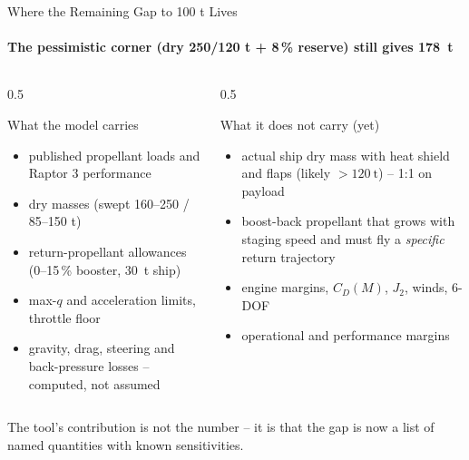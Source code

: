 \documentclass[aspectratio=169,10pt]{beamer}
\begin{document}
\begin{frame}{Where the Remaining Gap to 100 t Lives}
  \framesubtitle{The pessimistic corner (dry 250/120 t + 8\,\% reserve) still gives \SI{178}{\tonne}}
  \begin{columns}[T]
    \begin{column}{0.5\textwidth}
      \begin{block}{What the model carries}
        \begin{itemize}
          \item published propellant loads and Raptor 3 performance
          \item dry masses (swept 160--250 / 85--150 t)
          \item return-propellant allowances (0--15\,\% booster, \SI{30}{\tonne} ship)
          \item max-$q$ and acceleration limits, throttle floor
          \item gravity, drag, steering and back-pressure losses -- computed, not assumed
        \end{itemize}
      \end{block}
    \end{column}
    \begin{column}{0.5\textwidth}
      \begin{block}{What it does not carry (yet)}
        \begin{itemize}
          \item actual ship dry mass with heat shield and flaps (likely $>\SI{120}{\tonne}$) -- 1:1 on payload
          \item boost-back propellant that grows with staging speed and must fly a \emph{specific} return trajectory
          \item engine margins, $C_D(M)$, $J_2$, winds, 6-DOF
          \item operational and performance margins
        \end{itemize}
      \end{block}
    \end{column}
  \end{columns}
  \vspace{6pt}
  \centering
  The tool's contribution is not the number -- it is that the gap is now a list of named quantities with known sensitivities.
\end{frame}

\end{document}
